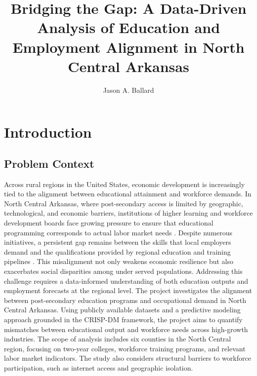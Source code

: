 \documentclass[runningheads]{llncs}
\title{Bridging the Gap: A Data-Driven Analysis of Education and Employment Alignment in North Central Arkansas}
\author{Jason A. Ballard}
\institute{Northwest Missouri State University, Maryville MO 64468, USA \\\email{S574020@nwmissouri.edu}}
\begin{document}
\maketitle

\begin{abstract}

\end{abstract}

\section{Introduction}

\subsection{Problem Context}
Across rural regions in the United States, economic development is increasingly tied to the alignment between educational attainment and workforce demands.  In North Central Arkansas, where post-secondary access is limited by geographic, technological, and economic barriers, institutions of higher learning and workforce development boards face growing pressure to ensure that educational programming corresponds to actual labor market needs \cite{ecs2021,wadhwani2020,apprenticeship2021}. Despite numerous initiatives, a persistent gap remains between the skills that local employers demand and the qualifications provided by regional education and training pipelines \cite{ecs2021,wadhwani2020}. This misalignment not only weakens economic resilience but also exacerbates social disparities among under served populations. Addressing this challenge requires a data-informed understanding of both education outputs and employment forecasts at the regional level. The project investigates the alignment between post-secondary education programs and occupational demand in North Central Arkansas. Using publicly available datasets and a predictive modeling approach grounded in the CRISP-DM framework, the project aims to quantify mismatches between educational output and workforce needs across high-growth industries. The scope of analysis includes six counties in the North Central region, focusing on two-year colleges, workforce training programs, and relevant labor market indicators. The study also considers structural barriers to workforce participation, such as internet access and geographic isolation.
\end{document}
